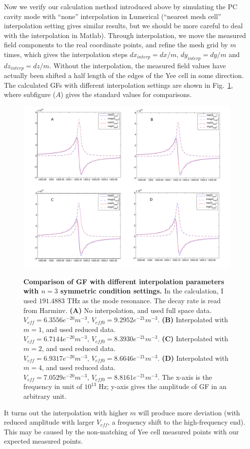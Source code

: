 Now we verify our calculation method introduced above by simulating the PC cavity mode with ``none'' interpolation in Lumerical (``nearest mesh cell'' interpolation setting gives similar results, but we should be more careful to deal with the interpolation in Matlab). Through interpolation, we move the measured field components to the real coordinate points, and refine the mesh grid by $m$ times, which gives the interpolation steps $dx_{interp}=dx/m, \,dy_{interp}=dy/m$ and $dz_{interp}=dz/m$. Without the interpolation, the measured field values have actually been  shifted a half length of the edges of the Yee cell in some direction. The calculated GFs with different interpolation settings are shown in Fig.~\ref{G68_interp}, where subfigure ($A$) gives the standard values for comparisons.
\begin{figure}[htp]
\centering
\begin{center}
{\includegraphics[width=16cm]{./Figs/G68_interp}}
\end{center}
\caption[Comparison of GF with different interpolation parameters.]{\textbf{Comparison of GF with different interpolation parameters with $n=3$ symmetric condition settings.} In the calculation, I used $191.4883$ THz as the mode resonance. The decay rate is read from Harminv. \textbf{(A)} No interpolation, and used full space data. $V_{eff} = 6.3556e^{-20}m^{-3},\, V_{eff0} = 9.2952e^{-21}m^{-3}$. \textbf{(B)} Interpolated with $m=1$, and used reduced data. $V_{eff} =  6.7144e^{-20}m^{-3},\,V_{eff0} = 8.3930e^{-21}m^{-3}$. \textbf{(C)} Interpolated with $m=2$, and used reduced data. $V_{eff} =  6.9317e^{-20}m^{-3},\, V_{eff0} = 8.6646e^{-21}m^{-3}$. \textbf{(D)} Interpolated with $m=4$, and used reduced data. $V_{eff} =  7.0529e^{-20}m^{-3},\, V_{eff0} =  8.8161e^{-21}m^{-3}$. The x-axis is the frequency in unit of $10^{13}$ Hz; y-axis gives the amplitude of GF in an arbitrary unit.}
\label{G68_interp}
\end{figure}
It turns out the interpolation with higher $m$ will produce more deviation (with reduced amplitude with larger $V_{eff}$, a frequency shift to the high-frequency end). This may be caused by the non-matching of Yee cell measured points with our expected measured points.

